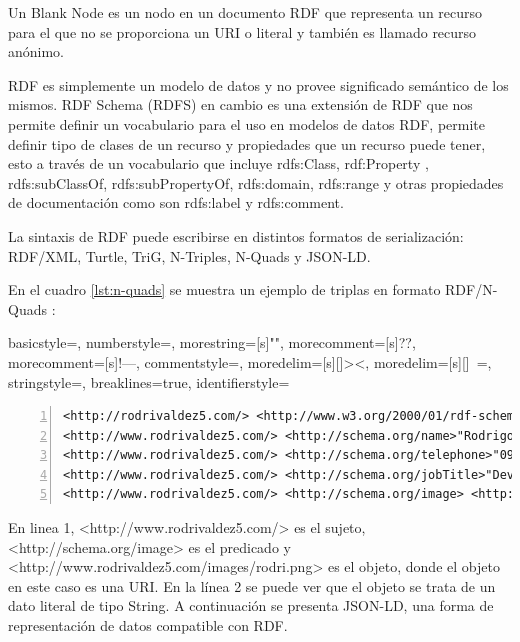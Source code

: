 Un Blank Node es un nodo en un documento RDF que representa un recurso para el que no se proporciona un URI o literal y también es llamado recurso anónimo.

RDF es simplemente un modelo de datos y no provee significado semántico de los mismos. RDF Schema (RDFS) en cambio es una extensión de RDF que nos permite definir un vocabulario para el uso en modelos de datos RDF, permite definir tipo de clases de un recurso y propiedades que un recurso puede tener, esto a través de un vocabulario que incluye rdfs:Class, rdf:Property , rdfs:subClassOf, rdfs:subPropertyOf, rdfs:domain, rdfs:range y otras propiedades de documentación como son rdfs:label y rdfs:comment.

La sintaxis de RDF puede escribirse en distintos formatos de serialización: RDF/XML, Turtle, TriG, N-Triples, N-Quads y JSON-LD.

En el cuadro \ref{lst:n-quads} se muestra un ejemplo de triplas en formato RDF/N-Quads :

{
  basicstyle=\ttfamily,
  numberstyle=\scriptsize,
  morestring=[s]{"}{"},
  morecomment=[s]{?}{?},
  morecomment=[s]{!--}{--},
  commentstyle=\color{darkgreen},
  moredelim=[s][\color{black}]{>}{<},
  moredelim=[s][\color{red}]{\ }{=},
  stringstyle=\color{blue},
  breaklines=true,
  identifierstyle=\color{maroon}
}

\begin{lstlisting}[captionpos=b, caption=Ejemplo en RDF/N-Quads, label=lst:n-quads,  numbers=left,  numberstyle=\tiny\color{mygray},
    basicstyle=\tiny,frame=single]
<http://rodrivaldez5.com/> <http://www.w3.org/2000/01/rdf-schema#type> <http://schema.org/person> .  
<http://www.rodrivaldez5.com/> <http://schema.org/name>"Rodrigo Valdez" .
<http://www.rodrivaldez5.com/> <http://schema.org/telephone>"0981530572" .
<http://www.rodrivaldez5.com/> <http://schema.org/jobTitle>"Developer" .
<http://www.rodrivaldez5.com/> <http://schema.org/image> <http://www.rodrivaldez5.com/images/rodri.png> .
\end{lstlisting}


En linea 1, <http://www.rodrivaldez5.com/> es el sujeto, <http://schema.org/image> es el predicado y <http://www.rodrivaldez5.com/images/rodri.png> es el objeto, donde el objeto en este caso es una URI. En la línea 2 se puede ver que el objeto se trata de un dato literal de tipo String.  A continuación se presenta JSON-LD, una forma de representación de datos compatible con RDF.

